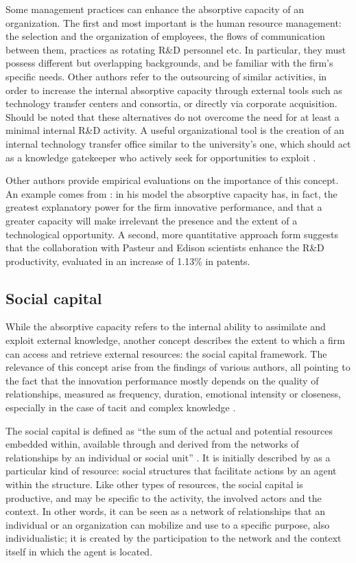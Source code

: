 Some management practices can enhance the absorptive capacity of an organization. The first and most important is the human resource management: the selection and the organization of employees, the flows of communication between them, practices as rotating R\&D personnel etc. In particular, they must possess different but overlapping backgrounds, and be familiar with the firm's specific needs. Other authors refer to the outsourcing of similar activities, in order to increase the internal absorptive capacity through external tools such as technology transfer centers and consortia, or directly via corporate acquisition. Should be noted that these alternatives do not overcome the need for at least a minimal internal R\&D activity. A useful organizational tool is the creation of an internal technology transfer office similar to the university's one, which should act as a knowledge gatekeeper who actively seek for opportunities to exploit \citep{Alexander2013}.

Other authors provide empirical evaluations on the importance of this concept. An example comes from \citet{Nieto2005}: in his model the absorptive capacity has, in fact, the greatest explanatory power for the firm innovative performance, and that a greater capacity will make irrelevant the presence and the extent of a technological opportunity. A second, more quantitative approach form \citet{Baba2009} suggests that the collaboration with Pasteur and Edison scientists enhance the R\&D productivity, evaluated in an increase of 1.13\% in patents.

\subsection{Social capital}

While the absorptive capacity refers to the internal ability to assimilate and exploit external knowledge, another concept describes the extent to which a firm can access and retrieve external resources: the social capital framework. The relevance of this concept arise from the findings of various authors, all pointing to the fact that the innovation performance mostly depends on the quality of relationships, measured as frequency, duration, emotional intensity or closeness, especially in the case of tacit and complex knowledge \citep{Perez-Luno2011}. 

The social capital is defined as \enquote{the sum of the actual and potential resources embedded within, available through and derived from the networks of relationships by an individual or social unit} \citep{Perez-Luno2011}. It is initially described by \citet{Coleman1988} as a particular kind of resource: social structures that facilitate actions by an agent within the structure. Like other types of resources, the social capital is productive, and may be specific to the activity, the involved actors and the context. In other words, it can be seen as a network of relationships that an individual or an organization can mobilize and use to a specific purpose, also individualistic; it is created by the participation to the network and the context itself in which the agent is located.

